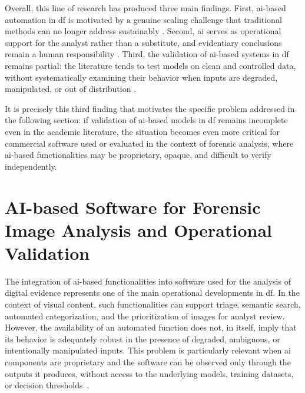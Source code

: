 Overall, this line of research has produced three main findings. First,
\gls{ai}-based automation in \gls{df} is motivated by a genuine scaling
challenge that traditional methods can no longer address sustainably
\cite{garfinkel2010digital,costantini2019digital}. Second, \gls{ai} serves as
operational support for the analyst rather than a substitute, and evidentiary
conclusions remain a human responsibility
\cite{faqir2023digital,sanna2025cybercrime}. Third, the validation of
\gls{ai}-based systems in \gls{df} remains partial: the literature tends to
test models on clean and controlled data, without systematically examining
their behavior when inputs are degraded, manipulated, or out of distribution
\cite{sanna2024preliminary,sanna2025pixelperfect}.

It is precisely this third finding that motivates the specific problem
addressed in the following section: if validation of \gls{ai}-based models in
\gls{df} remains incomplete even in the academic literature, the situation
becomes even more critical for commercial software used or evaluated in the
context of forensic analysis, where \gls{ai}-based functionalities may be
proprietary, opaque, and difficult to verify independently.


\section{AI-based Software for Forensic Image Analysis and Operational Validation}
\label{sec:sota-ai-tools}
The integration of \gls{ai}-based functionalities into software used for the
analysis of digital evidence represents one of the main operational
developments in \gls{df}. In the context of visual content, such
functionalities can support triage, semantic search, automated categorization,
and the prioritization of images for analyst review. However, the availability
of an automated function does not, in itself, imply that its behavior is
adequately robust in the presence of degraded, ambiguous, or intentionally
manipulated inputs. This problem is particularly relevant when \gls{ai}
components are proprietary and the software can be observed only through the
outputs it produces, without access to the underlying models, training
datasets, or decision thresholds~\cite{costantini2019digital,sanna2024preliminary,sanna2025pixelperfect}.

